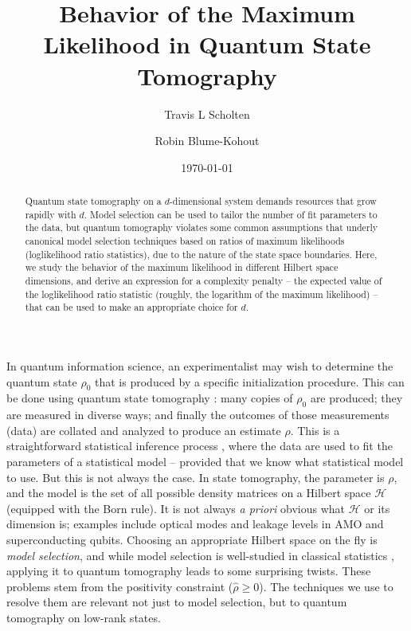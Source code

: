 \documentclass[aps,pra, twocolumn]{revtex4}
\newcommand{\cH}{\mathcal{H}}
\newcommand{\rhohat}{\hat{\rho}}
\begin{document}
\author{Travis L Scholten}
\author{Robin Blume-Kohout}

\title{Behavior of the Maximum Likelihood in Quantum State Tomography}

\begin{abstract}
Quantum state tomography on a $d$-dimensional system demands resources that grow rapidly with $d$. Model selection can be used to tailor the number of fit parameters to the data, but quantum tomography violates some common assumptions that underly canonical model selection techniques based on ratios of maximum likelihoods (loglikelihood ratio statistics), due to the nature of the state space boundaries. Here, we study the behavior of the maximum likelihood  in different Hilbert space dimensions, and derive an expression for a complexity penalty -- the expected value of the loglikelihood ratio statistic (roughly, the logarithm of the maximum likelihood) -- that can be used to make an appropriate choice for $d$.
\end{abstract}
\date{\today}

\maketitle

In quantum information science, an experimentalist may wish to determine the quantum state $\rho_{0}$ that is produced by a specific initialization procedure.  This can be done using quantum state tomography \cite{Paris2004}:  many copies of $\rho_{0}$ are produced; they are measured in diverse ways; and finally the outcomes of those measurements (data) are collated and analyzed to produce an estimate $\rhohat$.  This is a straightforward statistical inference process \cite{Reid2015, Wasserman2004}, where the data are used to fit the parameters of a statistical model -- provided that we know what statistical model to use.  But this is not always the case.  In state tomography, the parameter is $\rho$, and the model is the set of all possible density matrices on a Hilbert space $\cH$ (equipped with the Born rule). It is not always \emph{a priori} obvious what $\cH$ or its dimension is; examples include optical modes \cite{Altepeter2005, Bertrand1987, Lvovsky2009, Breitenbach1997, Leonhardt1995} and leakage levels in AMO and superconducting \cite{Motzoi2009, Fazio1999} qubits.  Choosing an appropriate Hilbert space on the fly is \emph{model selection}, and while model selection is well-studied in classical statistics \cite{Burnham2004}, applying it to quantum tomography leads to some surprising twists.  These problems stem from the positivity constraint ($\rhohat\geq0$). The techniques we use to resolve them are relevant not just to model selection, but to quantum tomography on low-rank states.
\end{document}
